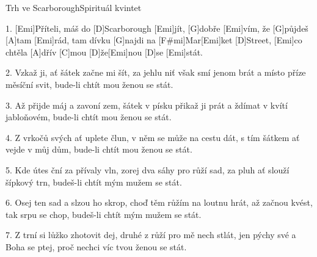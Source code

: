 \begin{song}{Trh ve Scarborough}{Spirituál kvintet}

\begin{xverse}{1. }
[Emi]Příteli, máš do [D]Scarborough [Emi]jít,
[G]dobře [Emi]vím, že [G]půjdeš [A]tam [Emi]rád,
tam dívku [G]najdi na [F#mi]Mar[Emi]ket [D]Street,
[Emi]co chtěla [A]dřív [C]mou [D]{že}[Emi]nou [D]se [Emi]stát.
\end{xverse}

\begin{xverse}{2. }
Vzkaž ji, ať šátek začne mi šít,
za jehlu niť však smí jenom brát
a místo příze měsíční svit,
bude-li chtít mou ženou se stát.
\end{xverse}

\begin{xverse}{3. }
Až přijde máj a zavoní zem,
šátek v písku přikaž ji prát
a ždímat v kvítí jabloňovém,
bude-li chtít mou ženou se stát.
\end{xverse}

\begin{xverse}{4. }
Z vrkočů svých ať uplete člun,
v něm se může na cestu dát,
s tím šátkem ať vejde v můj dům,
bude-li chtít mou ženou se stát.
\end{xverse}

\begin{xverse}{5. }
Kde útes ční za přívaly vln,
zorej dva sáhy pro růží sad,
za pluh ať slouží šípkový trn,
budeš-li chtít mým mužem se stát.
\end{xverse}

\begin{xverse}{6. }
Osej ten sad a slzou ho skrop,
choď těm růžím na loutnu hrát,
až začnou kvést, tak srpu se chop,
budeš-li chtít mým mužem se stát.
\end{xverse}

\begin{xverse}{7. }
Z trní si lůžko zhotovit dej,
druhé z růží pro mě nech stlát,
jen pýchy své a Boha se ptej,
proč nechci víc tvou ženou se stát.
\end{xverse}

\end{song}

